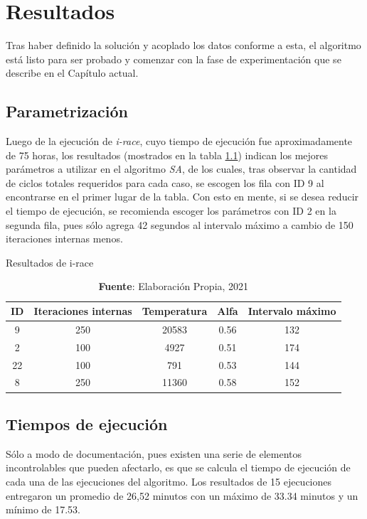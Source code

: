 \chapter{Resultados}

Tras haber definido la solución y acoplado los datos conforme a esta, el algoritmo está listo para ser probado y comenzar con la fase de experimentación que se describe en el Capítulo actual.

\section{Parametrización}

Luego de la ejecución de \textit{i-race}, cuyo tiempo de ejecución fue aproximadamente de 75 horas, los resultados (mostrados en la tabla \ref{tab:5.1}) indican los mejores parámetros a utilizar en el algoritmo \textit{SA}, de los cuales, tras observar la cantidad de ciclos totales requeridos para cada caso, se escogen los fila con ID 9 al encontrarse en el primer lugar de la tabla. Con esto en mente, si se desea reducir el tiempo de ejecución, se recomienda escoger los parámetros con ID 2 en la segunda fila, pues sólo agrega 42 segundos al intervalo máximo a cambio de 150 iteraciones internas menos.

\begin{table}[H]
\centering
\def\arraystretch{1.8}
\captionsetup{justification=centering}
\caption{Resultados de i-race}
\label{tab:5.1}
\begin{tabular}{|c|c|c|c|c|}
\hline
\textbf{ID} & \textbf{Iteraciones internas} & \textbf{Temperatura} & \textbf{Alfa} & \textbf{Intervalo máximo} \\
\hline
9 & 250 & 20583 & 0.56 & 132         \\ \hline
2 & 100 & 4927 & 0.51 & 174          \\ \hline
22 & 100 & 791 & 0.53 & 144          \\ \hline
8 & 250 & 11360 & 0.58 & 152         \\ \hline
\end{tabular}
\caption*{\textbf{Fuente}: Elaboración Propia, 2021}
\end{table}

\section{Tiempos de ejecución}

Sólo a modo de documentación, pues existen una serie de elementos incontrolables que pueden afectarlo, es que se calcula el tiempo de ejecución de cada una de las ejecuciones del algoritmo. Los resultados de 15 ejecuciones entregaron un promedio de 26,52 minutos con un máximo de 33.34 minutos y un mínimo de 17.53.

